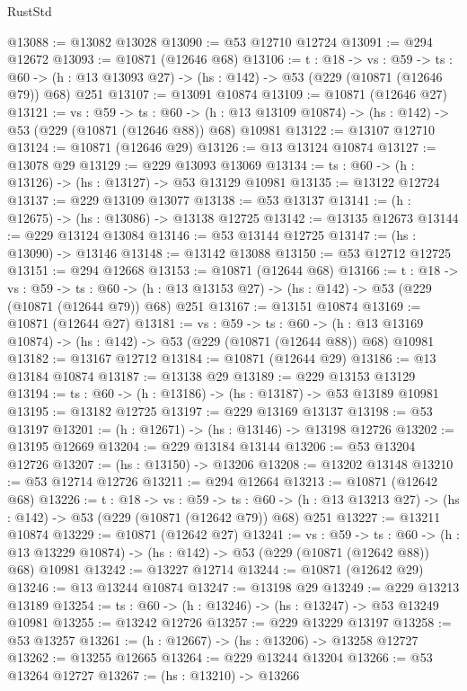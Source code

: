 \begin{lexlean}{RustStd}
\begin{coremodule}
@13088 := @13082 @13028
@13090 := @53 @12710 @12724
@13091 := @294 @12672
@13093 := @10871 (@12646 @68)
@13106 := {t : @18} ->
  {vs : @59} ->
  {ts : @60} -> (h : @13 @13093 @27) -> (hs : @142) -> @53 (@229 (@10871 (@12646 @79)) @68) @251
@13107 := @13091 @10874
@13109 := @10871 (@12646 @27)
@13121 := {vs : @59} ->
  {ts : @60} ->
  (h : @13 @13109 @10874) -> (hs : @142) -> @53 (@229 (@10871 (@12646 @88)) @68) @10981
@13122 := @13107 @12710
@13124 := @10871 (@12646 @29)
@13126 := @13 @13124 @10874
@13127 := @13078 @29
@13129 := @229 @13093 @13069
@13134 := {ts : @60} -> (h : @13126) -> (hs : @13127) -> @53 @13129 @10981
@13135 := @13122 @12724
@13137 := @229 @13109 @13077
@13138 := @53 @13137
@13141 := (h : @12675) -> (hs : @13086) -> @13138 @12725
@13142 := @13135 @12673
@13144 := @229 @13124 @13084
@13146 := @53 @13144 @12725
@13147 := (hs : @13090) -> @13146
@13148 := @13142 @13088
@13150 := @53 @12712 @12725
@13151 := @294 @12668
@13153 := @10871 (@12644 @68)
@13166 := {t : @18} ->
  {vs : @59} ->
  {ts : @60} -> (h : @13 @13153 @27) -> (hs : @142) -> @53 (@229 (@10871 (@12644 @79)) @68) @251
@13167 := @13151 @10874
@13169 := @10871 (@12644 @27)
@13181 := {vs : @59} ->
  {ts : @60} ->
  (h : @13 @13169 @10874) -> (hs : @142) -> @53 (@229 (@10871 (@12644 @88)) @68) @10981
@13182 := @13167 @12712
@13184 := @10871 (@12644 @29)
@13186 := @13 @13184 @10874
@13187 := @13138 @29
@13189 := @229 @13153 @13129
@13194 := {ts : @60} -> (h : @13186) -> (hs : @13187) -> @53 @13189 @10981
@13195 := @13182 @12725
@13197 := @229 @13169 @13137
@13198 := @53 @13197
@13201 := (h : @12671) -> (hs : @13146) -> @13198 @12726
@13202 := @13195 @12669
@13204 := @229 @13184 @13144
@13206 := @53 @13204 @12726
@13207 := (hs : @13150) -> @13206
@13208 := @13202 @13148
@13210 := @53 @12714 @12726
@13211 := @294 @12664
@13213 := @10871 (@12642 @68)
@13226 := {t : @18} ->
  {vs : @59} ->
  {ts : @60} -> (h : @13 @13213 @27) -> (hs : @142) -> @53 (@229 (@10871 (@12642 @79)) @68) @251
@13227 := @13211 @10874
@13229 := @10871 (@12642 @27)
@13241 := {vs : @59} ->
  {ts : @60} ->
  (h : @13 @13229 @10874) -> (hs : @142) -> @53 (@229 (@10871 (@12642 @88)) @68) @10981
@13242 := @13227 @12714
@13244 := @10871 (@12642 @29)
@13246 := @13 @13244 @10874
@13247 := @13198 @29
@13249 := @229 @13213 @13189
@13254 := {ts : @60} -> (h : @13246) -> (hs : @13247) -> @53 @13249 @10981
@13255 := @13242 @12726
@13257 := @229 @13229 @13197
@13258 := @53 @13257
@13261 := (h : @12667) -> (hs : @13206) -> @13258 @12727
@13262 := @13255 @12665
@13264 := @229 @13244 @13204
@13266 := @53 @13264 @12727
@13267 := (hs : @13210) -> @13266

\end{coremodule}
\end{lexlean}
